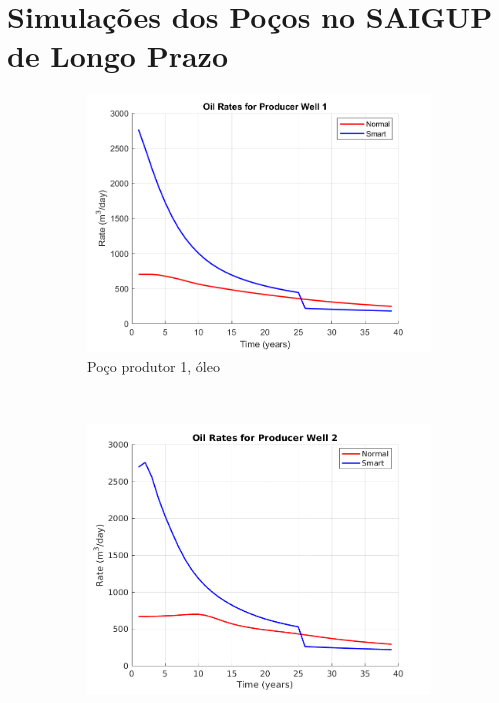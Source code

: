 \chapter{Simula\c{c}\~{o}es dos Po\c{c}os no SAIGUP de Longo Prazo}

\begin{figure}[!ht]
	\centering
	\begin{subfigure}[b]{.3\textwidth}
		\includegraphics[width=\textwidth]{figs/resultadosLSAIGUP/LSAIGUP_OilWell1_Zoom}
		\caption{Po\c{c}o produtor 1, \'{o}leo}
		\label{LSAIGUP_OilWell1}
	\end{subfigure}
	~
	\begin{subfigure}[b]{.3\textwidth}
		\includegraphics[width=\textwidth]{figs/resultadosLSAIGUP/LSAIGUP_OilWell2_Zoom}

\end{subfigure}
\end{figure}

